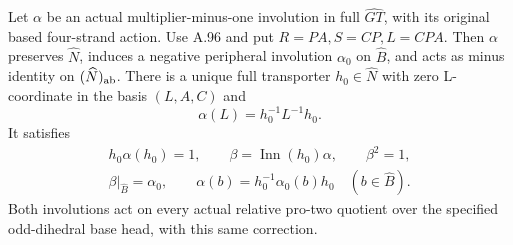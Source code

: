 Let \(\alpha\) be an actual multiplier-minus-one involution in full
\(\widehat{GT}\), with its original based four-strand action. Use
A.96 and put \(R=PA,S=CP,L=CPA\). Then \(\alpha\) preserves
\(\widehat N\), induces a negative peripheral involution
\(\alpha_0\) on \(\widehat B\), and acts as minus identity on
\((\widehat N)_{\rm ab}\). There is a unique full transporter
\(h_0\in\widehat N\) with zero L-coordinate in the basis
\((L,A,C)\) and
\[
 \alpha(L)=h_0^{-1}L^{-1}h_0.
 \tag{A.97.1}
\]
It satisfies
\[
\begin{gathered}
 h_0\alpha(h_0)=1,\qquad \beta=\operatorname{Inn}(h_0)\alpha,
 \qquad \beta^2=1,\\
 \beta|_{\widehat B}=\alpha_0,\qquad
 \alpha(b)=h_0^{-1}\alpha_0(b)h_0\quad(b\in\widehat B).
\end{gathered}
\tag{A.97.2}
\]
Both involutions act on every actual relative pro-two quotient over
the specified odd-dihedral base head, with this same correction.

